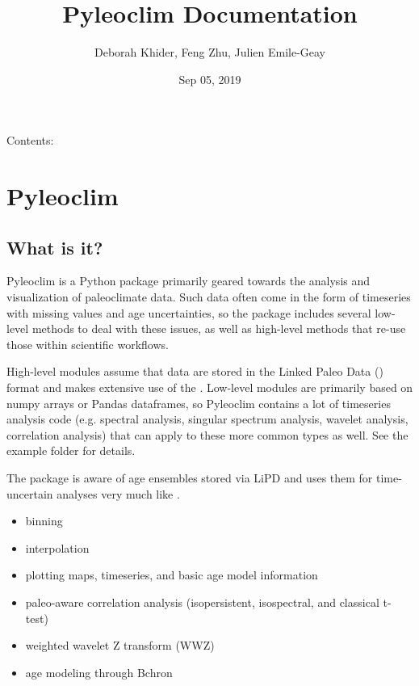 \documentclass[letterpaper,10pt,english]{sphinxmanual}
\title{Pyleoclim Documentation}
\date{Sep 05, 2019}
\author{Deborah Khider, Feng Zhu, Julien Emile-Geay}
\begin{document}
\pagestyle{empty}
\sphinxmaketitle
\pagestyle{plain}
\sphinxtableofcontents
\pagestyle{normal}
\label{\detokenize{index::doc}}


Contents:


\chapter{Pyleoclim}
\label{\detokenize{Introduction:pyleoclim}}\label{\detokenize{Introduction::doc}}

\section{What is it?}
\label{\detokenize{Introduction:what-is-it}}
Pyleoclim is a Python package primarily geared towards the analysis and visualization of paleoclimate data.
Such data often come in the form of timeseries with missing values and age uncertainties,
so the package includes several low-level methods to deal with these issues,
as well as high-level methods that re-use those within scientific workflows.

High-level modules assume that data are stored in the Linked Paleo Data () format
and makes extensive use of the . Low-level modules are primarily
based on numpy arrays or Pandas dataframes, so Pyleoclim contains a lot of
timeseries analysis code (e.g. spectral analysis, singular spectrum analysis,
wavelet analysis, correlation analysis) that can apply to these more common types
as well. See the example folder for details.

The package is aware of age ensembles stored via LiPD and uses them for time-uncertain analyses very much like .

\begin{itemize}
\item {} 
binning

\item {} 
interpolation

\item {} 
plotting maps, timeseries, and basic age model information

\item {} 
paleo-aware correlation analysis (isopersistent, isospectral, and classical t-test)

\item {} 
weighted wavelet Z transform (WWZ)

\item {} 
age modeling through Bchron

\end{itemize}
\end{document}
